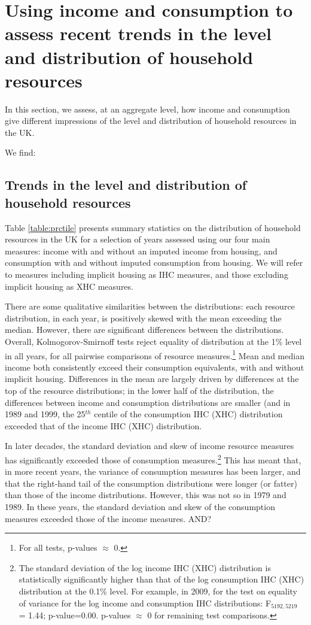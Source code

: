 \section{Using income and consumption to assess recent trends in the level and distribution of household resources}\label{sec:trends}

In this section, we assess, at an aggregate level, how income and consumption give different impressions of the level and distribution of household resources in the UK.

We find:

\subsection{Trends in the level and distribution of household resources}

Table \ref{table:prctile} presents summary statistics on the distribution of household resources in the UK for a selection of years assessed using our four main measures: income with and without an imputed income from housing, and consumption with and without imputed consumption from housing. We will refer to measures including implicit housing as IHC measures, and those excluding implicit housing as XHC measures.

There are some qualitative similarities between the distributions: each resource distribution, in each year, is positively skewed with the mean exceeding the median. However, there are significant differences between the distributions. Overall, Kolmogorov-Smirnoff tests reject equality of distribution at the 1\% level in all years, for all pairwise comparisons of resource measures.\footnote{For all tests, p-values $\approx$ 0.} Mean and median income both consistently exceed their consumption equivalents, with and without implicit housing. Differences in the mean are largely driven by differences at the top of the resource distributions; in the lower half of the distribution, the differences between income and consumption distributions are smaller (and in 1989 and 1999, the 25$^{th}$ centile of the consumption IHC (XHC) distribution exceeded that of the income IHC (XHC) distribution.

In later decades, the standard deviation and skew of income resource measures has significantly exceeded those of consumption measures.\footnote{The standard deviation of the log income IHC (XHC) distribution is statistically significantly higher than that of the log consumption IHC (XHC) distribution at the 0.1\% level. For example, in 2009, for the test on equality of variance for the log income and consumption IHC distributions: F$_{5192,5219}$ = 1.44; p-value=0.00. p-values $\approx$ 0 for remaining test comparisons.} This has meant that, in more recent years, the variance of consumption measures has been larger, and that the right-hand tail of the consumption distributions were longer (or fatter) than those of the income distributions. However, this was not so in 1979 and 1989. In these years, the standard deviation and skew of the consumption measures exceeded those of the income measures. AND?

